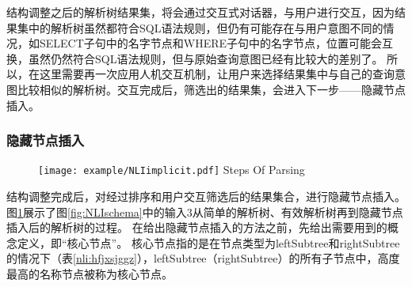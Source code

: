 结构调整之后的解析树结果集，将会通过交互式对话器，与用户进行交互，因为结果集中的解析树虽然都符合SQL语法规则，但仍有可能存在与用户意图不同的情况，如SELECT子句中的名字节点和WHERE子句中的名字节点，位置可能会互换，虽然仍然符合SQL语法规则，但与原始查询意图已经有比较大的差别了。
所以，在这里需要再一次应用人机交互机制，让用户来选择结果集中与自己的查询意图比较相似的解析树。交互完成后，筛选出的结果集，会进入下一步——隐藏节点插入。

\subsubsection{隐藏节点插入}

\begin{figure}[!htp]
  \centering
  \texttt{[image: example/NLIimplicit.pdf]}
    {Steps Of Parsing}
  \label{fig:NLIimplicit}
\end{figure}

结构调整完成后，对经过排序和用户交互筛选后的结果集合，进行隐藏节点插入。
图\ref{fig:NLIimplicit}展示了图\ref{fig:NLIschema}中的输入3从简单的解析树、有效解析树再到隐藏节点插入后的解析树的过程。
在给出隐藏节点插入的方法之前，先给出需要用到的概念定义，即“核心节点”。
核心节点指的是在节点类型为leftSubtree和rightSubtree的情况下（表\ref{nli:hfjxsjggz}），leftSubtree（rightSubtree）的所有子节点中，高度最高的名称节点被称为核心节点。

